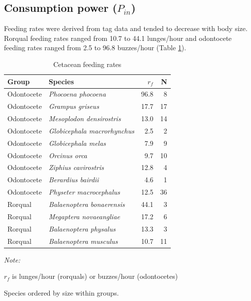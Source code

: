\documentclass[]{elsarticle} %
\begin{document}
\subsection{\texorpdfstring{Consumption power
(\(P_{in}\))}{Consumption power (P\_\{in\})}}\label{consumption-power-p_in-1}

Feeding rates were derived from tag data and tended to decrease with
body size. Rorqual feeding rates ranged from 10.7 to 44.1 lunges/hour
and odontocete feeding rates ranged from 2.5 to 96.8 buzzes/hour (Table
\ref{rf_tbl}).

\begin{table}[t]

\caption{\label{tab:unnamed-chunk-1}Cetacean feeding rates \label{rf_tbl}}
\centering
\begin{threeparttable}
\begin{tabular}{llrr}
\toprule
Group & Species & $r_f$ & N\\
\midrule
Odontocete & \textit{Phocoena phocoena} & 96.8 & 8\\
Odontocete & \textit{Grampus griseus} & 17.7 & 17\\
Odontocete & \textit{Mesoplodon densirostris} & 13.0 & 14\\
Odontocete & \textit{Globicephala macrorhynchus} & 2.5 & 2\\
Odontocete & \textit{Globicephala melas} & 7.9 & 9\\
Odontocete & \textit{Orcinus orca} & 9.7 & 10\\
Odontocete & \textit{Ziphius cavirostris} & 12.8 & 4\\
Odontocete & \textit{Berardius bairdii} & 4.6 & 1\\
Odontocete & \textit{Physeter macrocephalus} & 12.5 & 36\\
Rorqual & \textit{Balaenoptera bonaerensis} & 44.1 & 3\\
Rorqual & \textit{Megaptera novaeangliae} & 17.2 & 6\\
Rorqual & \textit{Balaenoptera physalus} & 13.3 & 3\\
Rorqual & \textit{Balaenoptera musculus} & 10.7 & 11\\
\bottomrule
\end{tabular}
\begin{tablenotes}
\item \textit{Note: } 
\item $r_f$ is lunges/hour (rorquals) or buzzes/hour (odontocetes)
\item Species ordered by size within groups.
\end{tablenotes}
\end{threeparttable}
\end{table}
\end{document}
